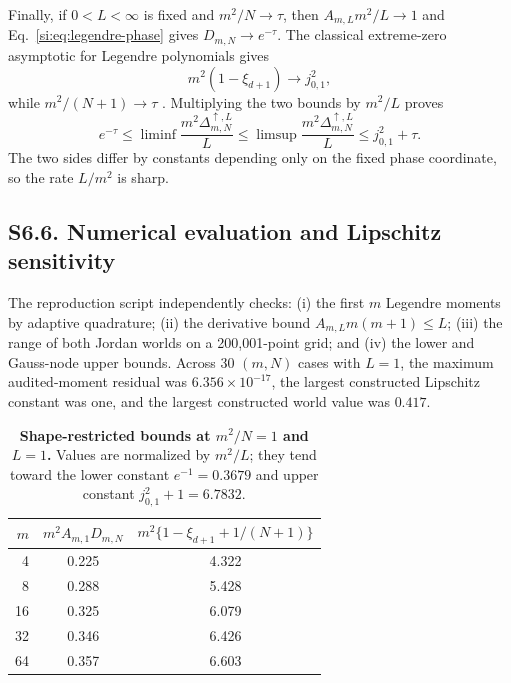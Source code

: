 \documentclass[10pt,twocolumn]{article}
\begin{document}
Finally, if $0<L<\infty$ is fixed and $m^2/N\to\tau$, then $A_{m,L}m^2/L\to1$ and Eq.~\ref{si:eq:legendre-phase} gives $D_{m,N}\to e^{-\tau}$. The classical extreme-zero asymptotic for Legendre polynomials gives
\begin{equation}
m^2(1-\xi_{d+1})\longrightarrow j_{0,1}^2,
\label{si:eq:gauss-bessel}
\end{equation}
while $m^2/(N+1)\to\tau$ \citep{szego1939}. Multiplying the two bounds by $m^2/L$ proves
\begin{equation}
e^{-\tau}\le\liminf\frac{m^2\Delta^{\uparrow,L}_{m,N}}L
\le\limsup\frac{m^2\Delta^{\uparrow,L}_{m,N}}L
\le j_{0,1}^2+\tau.
\label{si:eq:regular-phase}
\end{equation}
The two sides differ by constants depending only on the fixed phase coordinate, so the rate $L/m^2$ is sharp.

\subsection*{S6.6. Numerical evaluation and Lipschitz sensitivity}

The reproduction script independently checks: (i) the first $m$ Legendre moments by adaptive quadrature; (ii) the derivative bound $A_{m,L}m(m+1)\le L$; (iii) the range of both Jordan worlds on a 200,001-point grid; and (iv) the lower and Gauss-node upper bounds. Across 30 $(m,N)$ cases with $L=1$, the maximum audited-moment residual was $6.356\times10^{-17}$, the largest constructed Lipschitz constant was one, and the largest constructed world value was $0.417$.

\begin{table}[h]
\centering
\caption{\textbf{Shape-restricted bounds at $m^2/N=1$ and $L=1$.} Values are normalized by $m^2/L$; they tend toward the lower constant $e^{-1}=0.3679$ and upper constant $j_{0,1}^2+1=6.7832$.}
\label{si:tab:regular-bounds}
\begin{tabular}{rcc}
\toprule
$m$ & $m^2A_{m,1}D_{m,N}$ & $m^2\{1-\xi_{d+1}+1/(N+1)\}$ \\
\midrule
4  & 0.225 & 4.322 \\
8  & 0.288 & 5.428 \\
16 & 0.325 & 6.079 \\
32 & 0.346 & 6.426 \\
64 & 0.357 & 6.603 \\
\bottomrule
\end{tabular}
\end{table}
\end{document}
